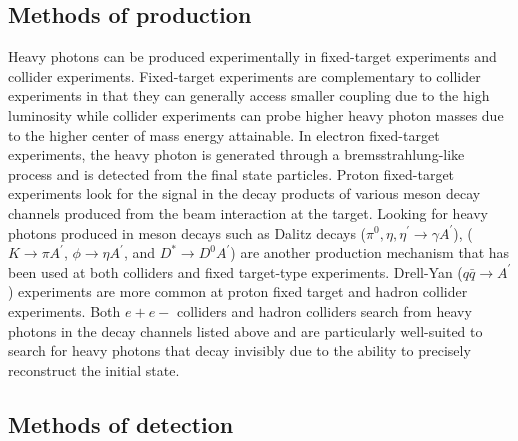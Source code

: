 \subsection{Methods of production}
Heavy photons can be produced experimentally in fixed-target experiments and collider experiments. Fixed-target experiments are complementary to collider experiments in that they can generally access smaller coupling due to the high luminosity while collider experiments can probe higher heavy photon masses due to the higher center of mass energy attainable. In electron fixed-target experiments, the heavy photon is generated through a bremsstrahlung-like process and is detected from the final state particles. Proton fixed-target experiments look for the signal in the decay products of various meson decay channels produced from the beam interaction at the target. Looking for heavy photons produced in meson decays such as Dalitz decays ($\pi^0, \eta, \eta^{\prime}\rightarrow \gamma A^{\prime}$), ($K\rightarrow\pi A^{\prime} $, $\phi\rightarrow\eta A^{\prime}$, and $D^{\ast}\rightarrow D^{0}A^{\prime}$) are another production mechanism that has been used at both colliders and fixed target-type experiments. Drell-Yan ($q\bar{q}\rightarrow A^{\prime}$) experiments are more common at proton fixed target and hadron collider experiments. Both $e+e-$ colliders and hadron colliders search from heavy photons in the decay channels listed above and are particularly well-suited to search for heavy photons that decay invisibly due to the ability to precisely reconstruct the initial state. 

\subsection{Methods of detection}

